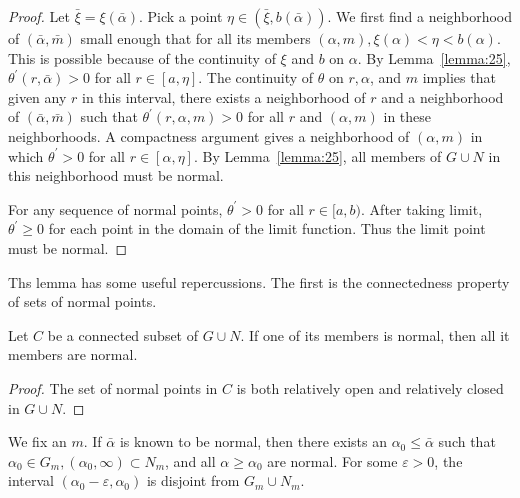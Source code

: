 \begin{proof}
  Let $\bar{\xi}=\xi(\bar{\alpha})$. Pick a point $\eta \in(\bar{\xi}, b(\bar{\alpha}))$.
  We first find a neighborhood of $(\bar{\alpha}, \bar{m})$ small enough that
  for all its members $(\alpha, m), \xi(\alpha)<\eta<b(\alpha)$.
  This is possible because of the continuity of $\xi$ and $b$ on $\alpha$.
  By Lemma~\ref{lemma:25}, $\theta^{\prime}(r, \bar{\alpha})>0$ for all $r \in[a, \eta]$.
  The continuity of $\theta$ on $r, \alpha$, and $m$ implies that given any $r$ in this 
  interval, there exists a neighborhood of $r$ and a neighborhood
  of $(\bar{\alpha}, \bar{m})$ such that $\theta^{\prime}(r, \alpha, m)>0$
  for all $r$ and $(\alpha, m)$ in these neighborhoods.
  A compactness argument gives a neighborhood of $(\alpha, m)$
  in which $\theta^{\prime}>0$ for all $r \in[\alpha, \eta]$.
  By Lemma~\ref{lemma:25}, all members of $G \cup N$ in this neighborhood must be normal.

  For any sequence of normal points, $\theta^{\prime}>0$ for all $r \in[a, b)$.
  After taking limit, $\theta^{\prime} \geq 0$ for each point in the
  domain of the limit function. Thus the limit point must be normal.
\end{proof}

Ths lemma has some useful repercussions.
The first is the connectedness property of sets of normal points.

\begin{lemma}\label{lemma:27}
  Let $C$ be a connected subset of $G \cup N$. If one of its members is normal,
  then all it members are normal.
\end{lemma}

\begin{proof}
  The set of normal points in $C$ is both relatively open and relatively closed in $G \cup N$.
\end{proof}

\begin{lemma}\label{lemma:28}
  We fix an $m$. If $\bar{\alpha}$ is known to be normal,
  then there exists an $\alpha_0 \leq \bar{\alpha}$ such that
  $\alpha_0 \in G_m,\left(\alpha_0, \infty\right) \subset N_m$,
  and all $\alpha \geq \alpha_0$ are normal. For some $\varepsilon>0$,
  the interval $\left(\alpha_0-\varepsilon, \alpha_0\right)$ is disjoint from $G_m \cup N_m$.
\end{lemma}

